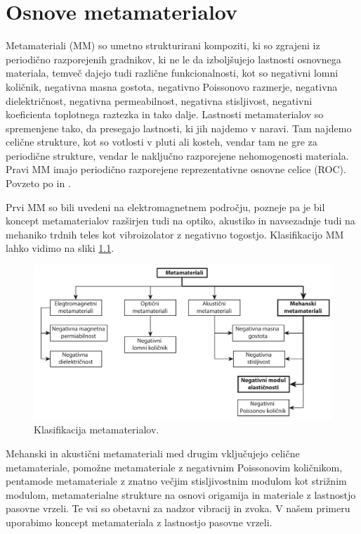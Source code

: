 \chapter{Osnove metamaterialov}\label{sec:osnove_metamaterialov}

    Metamateriali (MM) so umetno strukturirani kompoziti, ki so zgrajeni iz periodično razporejenih gradnikov, ki ne le da izboljšujejo lastnosti osnovnega materiala, temveč dajejo tudi različne funkcionalnosti, kot so negativni lomni količnik, negativna masna gostota, negativno Poissonovo razmerje, negativna dielektričnost, negativna permeabilnost, negativna stisljivost, negativni koeficienta toplotnega raztezka in tako dalje. Lastnosti metamaterialov so spremenjene tako, da presegajo lastnosti, ki jih najdemo v naravi. Tam najdemo celične strukture, kot so votlosti v pluti ali kosteh, vendar tam ne gre za periodične strukture, vendar le naključno razporejene nehomogenosti materiala. Pravi MM imajo periodično razporejene reprezentativne osnovne celice (ROC). Povzeto po \cite{Dalela2022} in \cite{Ji2021}. 
    
    Prvi MM so bili uvedeni na elektromagnetnem področju, pozneje pa je bil koncept metamaterialov razširjen tudi na optiko, akustiko in navsezadnje tudi na mehaniko trdnih teles kot vibroizolator z negativno togostjo. Klasifikacijo MM lahko vidimo na sliki  \ref{fig:klasifikacija metamaterialov}. 
    
    \begin{figure}[!hb]
            \centering
            \includegraphics[width=\linewidth]{Magisterski praktikum/slike/teorija/klasifikacija_metamaterialov.pdf}
            \caption{Klasifikacija metamaterialov.}\label{fig:klasifikacija metamaterialov}
    \end{figure}

    \newpage
    
    Mehanski in akustični metamateriali med drugim vključujejo celične metamateriale, pomožne metamateriale z negativnim Poissonovim količnikom, pentamode metamateriale z znatno večjim stisljivostnim modulom kot strižnim modulom, metamaterialne strukture na osnovi origamija in materiale z lastnostjo pasovne vrzeli. Te vsi so obetavni za nadzor vibracij in zvoka. V našem primeru uporabimo koncept metamateriala z lastnostjo pasovne vrzeli. 
    
